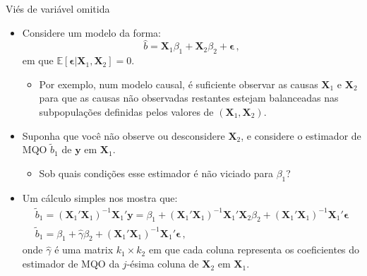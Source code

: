 \documentclass[11pt]{beamer}
\begin{document}
\begin{frame}{Viés de variável omitida}
\begin{itemize}
	\item Considere um modelo da forma:
	$$\hat{b} = \boldsymbol{X}_1 \beta_1 + \boldsymbol{X}_2 \beta_2 + \boldsymbol{\epsilon}\, ,$$
	em que $\mathbb{E}[\boldsymbol{\epsilon}|\boldsymbol{X}_1,\boldsymbol{X}_2] = 0$. 
	\begin{itemize}
		\item Por exemplo, num modelo causal, é suficiente observar as causas $\boldsymbol{X}_1$ e $\boldsymbol{X}_2$ para que as causas não observadas restantes estejam balanceadas nas subpopulações definidas pelos valores de $(\boldsymbol{X}_1,\boldsymbol{X}_2)$.
	\end{itemize}
	\item Suponha que você {\color{red}não observe ou desconsidere} $\boldsymbol{X}_2$, e considere o estimador de MQO $\tilde{b}_1$ de $\boldsymbol{y}$ em $\boldsymbol{X}_1$.
	\begin{itemize}
		\item Sob quais condições esse estimador é não viciado para $\beta_1$?
	\end{itemize}
	\item Um cálculo simples nos mostra que:
	\begin{equation*}
		\begin{aligned}
		\tilde{b}_1 = (\boldsymbol{X}_1'\boldsymbol{X}_1)^{-1}\boldsymbol{X}_1'\boldsymbol{y} = \beta_1 + (\boldsymbol{X}_1'\boldsymbol{X}_1)^{-1}\boldsymbol{X}_1' \boldsymbol{X}_2 \beta_2 +(\boldsymbol{X}_1'\boldsymbol{X}_1)^{-1}\boldsymbol{X}_1'\boldsymbol{\epsilon}  \\
		\tilde{b}_1 = \beta_1 + \hat{\gamma}\beta_2 + (\boldsymbol{X}_1'\boldsymbol{X}_1)^{-1}\boldsymbol{X}_1'\boldsymbol{\epsilon} \, ,
		\end{aligned}
	\end{equation*}
	onde $\hat{\gamma}$ é uma matrix $k_1\times k_2$ em que cada coluna representa os coeficientes do estimador de MQO da $j$-ésima coluna de $\boldsymbol{X}_2$ em $\boldsymbol{X}_1$.
	
\end{itemize}
\end{frame}
\end{document}

